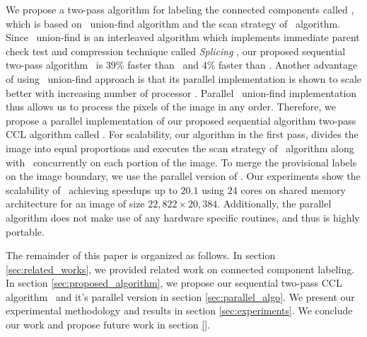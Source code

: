 We propose a two-pass algorithm for labeling the connected components called
\aremsp, which is based on \rems\ union-find algorithm \cite{Patwary2010_RemSP}
and the scan strategy of \arun\ algorithm. Since \rems\ union-find is an
interleaved algorithm which implements immediate parent check test and 
compression technique called {\em Splicing} \cite{Patwary2010_RemSP}, our
proposed sequential two-pass algorithm \aremsp\ is $39$\% faster than \lrpc\
and $4$\% faster than \arun.
Another advantage of using \rems\ union-find approach is that its parallel implementation is shown to scale better
with increasing number of processor \cite{Patwary2012_PARemSP}. Parallel \rems\ union-find implementation thus allows us to
process the pixels of the image in any order. Therefore, we propose a parallel implementation of our proposed
sequential algorithm two-pass CCL algorithm called \paremsp. For scalability,
our algorithm in the first pass, divides the image into equal proportions and executes the scan strategy of \arun\ algorithm along with \remsp\
concurrently on each portion of the image. To merge the provisional labels on the image boundary, we use the parallel version
of \remsp \cite{Patwary2012_PARemSP}. Our experiments show
the scalability of \paremsp\ achieving speedups up to $20.1$ using $24$ cores
on shared memory architecture for an image of size $22,822 \times 20,384$.
Additionally, the parallel algorithm does not make use of any hardware specific routines, and thus is highly portable.

The remainder of this paper is organized as follows. In section
\ref{sec:related_works}, we provided related work on connected component labeling.
In section \ref{sec:proposed_algorithm}, we propose our sequential two-pass CCL
algorithm \aremsp\ and it's parallel version in section
\ref{sec:parallel_algo}.
We present our experimental methodology and results in section
\ref{sec:experiments}. We conclude our work and propose future work in section \ref{}.


